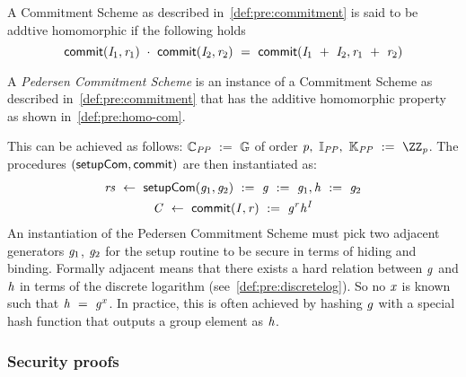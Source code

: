 \begin{definition}\label{def:pre:homo-com}
    A Commitment Scheme as described in~\cref{def:pre:commitment} is said to be addtive homomorphic if the following holds
    \[ \mathsf{commit}(\mathit{I}_1, \mathit{r}_1) ~\cdot~ \mathsf{commit}(\mathit{I}_2, \mathit{r}_2) ~=~ \mathsf{commit}(\mathit{I}_1 ~+~ \mathit{I}_2, \mathit{r}_1 ~+~ \mathit{r}_2) \]
\end{definition}



\begin{definition}\label{def:pre:pedersen}
    A \emph{Pedersen Commitment Scheme} is an instance of a Commitment Scheme as described in~\cref{def:pre:commitment} that has the additive homomorphic property as shown in~\cref{def:pre:homo-com}.

This can be achieved as follows:
    $\mathbb{C}_{\mathit{PP}} ~:=~ \mathbb{G}$ of order $\varPrime \opSeperate \varInputSpace_{\varPublicParam} \opSeperate \varRandSpace_{\varPublicParam} \opAssign \cnstIntegersPrime{\varPrime}$.
    The procedures $(\mathsf{setupCom}, \mathsf{commit})$ are then instantiated as:
    \begin{gather*}
        \mathit{rs} ~\leftarrow~ \mathsf{setupCom} (\mathit{g}_1,\mathit{g}_2) ~:=~ \mathit{g} ~:=~ \mathit{g}_1, \mathit{h} ~:=~ \mathit{g}_2  \\
        \mathit{C} ~\leftarrow~ \mathsf{commit}(\mathit{I}, \mathit{r}) ~:=~ \mathit{g}^{\mathit{r}} \mathit{h}^{\mathit{I}}\\
    \end{gather*}
    An instantiation of the Pedersen Commitment Scheme must pick two adjacent generators $\mathit{g}_1$, $\mathit{g}_2$ for the setup routine to be secure in terms of hiding and binding.
    Formally adjacent means that there exists a hard relation between $\mathit{g}$ and $\mathit{h}$ in terms of the discrete logarithm (see~\cref{def:pre:discretelog}).
So no $\mathit{x}$ is known such that $\mathit{h} ~=~ \mathit{g}^{x}$.
    In practice, this is often achieved by hashing $\mathit{g}$ with a special hash function that outputs a group element as $\mathit{h}$.

\end{definition}

\subsubsection{Security proofs}

